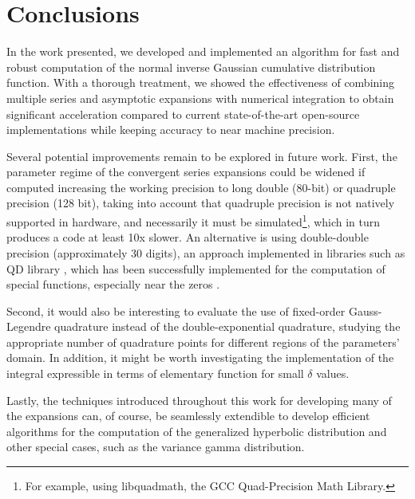 \documentclass[10pt,a4paper,oneside]{article}
\numberwithin{equation}{section}
\begin{document}
\section{Conclusions}
In the work presented, we developed and implemented an algorithm for fast and robust computation of the normal inverse Gaussian cumulative distribution function.
With a thorough treatment, we showed the effectiveness of combining multiple series and asymptotic expansions with numerical integration to obtain significant
acceleration compared to current state-of-the-art open-source implementations while keeping accuracy to near machine precision.

Several potential improvements remain to be explored in future work. 
First, the parameter regime of the convergent series expansions could be widened if computed increasing the working precision to long double (80-bit) or quadruple precision (128 bit), taking into account that quadruple precision is not natively supported in hardware, and necessarily it must be simulated\footnote{For example, using libquadmath, the GCC Quad-Precision Math Library.}, which in turn produces a code at least 10x slower. An alternative is using double-double precision (approximately 30 digits), an approach implemented in libraries such as QD library \cite{Hida2001}, which has been successfully implemented for the computation of special functions, especially near the zeros \cite{Navas-Palencia2018a}. 

Second, it would also be interesting to evaluate the use of fixed-order Gauss-Legendre quadrature instead of the double-exponential quadrature, studying the appropriate number of quadrature points for different regions of the parameters' domain. In addition, it might be worth investigating the implementation of the integral expressible in terms of elementary function for small $\delta$ values. 


Lastly, the techniques introduced throughout this work for developing many of the expansions can, of course, be seamlessly extendible to develop efficient algorithms for the computation of the generalized hyperbolic distribution and other special cases, such as the variance gamma distribution.
\end{document}
